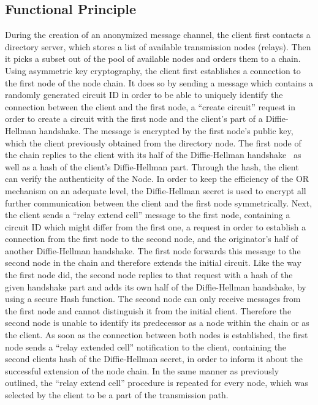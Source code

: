 \documentclass{sig-alternate}
\begin{document}
\subsection{Functional Principle}
During the creation of an anonymized message channel, the client first contacts a directory server, which stores a list of available transmission nodes (relays). Then it picks a subset out of the pool of available nodes and orders them to a chain. Using asymmetric key cryptography, the client first establishes a connection to the first node of the node chain. It does so by sending a message which contains a randomly generated circuit ID in order to be able to uniquely identify the connection between the client and the first node, a ``create circuit'' request in order to create a circuit with the first node and the client's part of a Diffie-Hellman handshake. The message is encrypted by the first node's public key, which the client previously obtained from the directory node. The first node of the chain replies to the client with its half of the Diffie-Hellman handshake~\cite{diffie1976new} as well as a hash of the client's Diffie-Hellman part. Through the hash, the client can verify the authenticity of the Node. In order to keep the efficiency of the OR mechanism on an adequate level, the Diffie-Hellman secret is used to encrypt all further communication between the client and the first node symmetrically. Next, the client sends a ``relay extend cell'' message to the first node, containing a circuit ID which might differ from the first one, a request in order to establish a connection from the first node to the second node, and the originator's half of another Diffie-Hellman handshake. The first node forwards this message to the second node in the chain and therefore extends the initial circuit. Like the way the first node did, the second node replies to that request with a hash of the given handshake part and adds its own half of the Diffie-Hellman handshake, by using a secure Hash function. The second node can only receive messages from the first node and cannot distinguish it from the initial client. Therefore the second node is unable to identify its predecessor as a node within the chain or as the client. As soon as the connection between both nodes is established, the first node sends a ``relay extended cell'' notification to the client, containing the second clients hash of the Diffie-Hellman secret, in order to inform it about the successful extension of the node chain. In the same manner as previously outlined, the ``relay extend cell'' procedure is repeated for every node, which was selected by the client to be a part of the transmission path.
\end{document}
